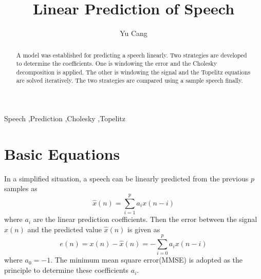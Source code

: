 \documentclass[preprint,12pt]{elsarticle}
\begin{document}
\begin{frontmatter}



\title{Linear Prediction of Speech}


\author{Yu Cang}
\address{Shanghai Jiao Tong University, China}

\begin{abstract}
A model was established for predicting a speech linearly. Two strategies are developed to determine the coefficients. One is windowing the error and the Cholesky decomposition is applied. The other is windowing the signal and the Topelitz equations are solved iteratively. The two strategies are compared using a sample speech finally.
\end{abstract}

\begin{keyword}
Speech \sep Prediction \sep Cholesky \sep Topelitz


\end{keyword}

\end{frontmatter}


\section{Basic Equations}
\label{S:1}
In a simplified situation, a speech can be linearly predicted from the previous $p$ samples as
\begin{equation}
	\hat{x}(n) =  \sum_{i=1}^{p} a_i x(n-i)
\end{equation}
where $a_i$ are the linear prediction coefficients. Then the error between the signal $x(n)$ and the predicted value $\hat{x}(n)$ is given as
\begin{equation}
	e(n) = x(n) - \hat{x}(n) = -\sum_{i=0}^{p}a_i x(n-i)
\end{equation}
where $a_0 = -1$. The minimum mean square error(MMSE) is adopted as the principle to determine these coefficients $a_i$.
\end{document}
